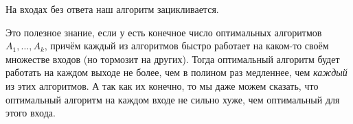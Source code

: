 	\begin{Rem}
		На входах без ответа наш алгоритм зацикливается.
	\end{Rem}
	\begin{Rem}
		Это полезное знание, если у есть конечное число оптимальных алгоритмов $A_1, \dots, A_k$, причём каждый из алгоритмов быстро работает на каком-то своём множестве входов (но тормозит на других).
		Тогда оптимальный алгоритм будет работать на каждом выходе не более, чем в полином раз медленнее, чем \textit{каждый} из этих алгоритмов.
		А так как их конечно, то мы даже можем сказать, что оптимальный алгоритм на каждом входе не сильно хуже, чем оптимальный для этого входа.
	\end{Rem}
